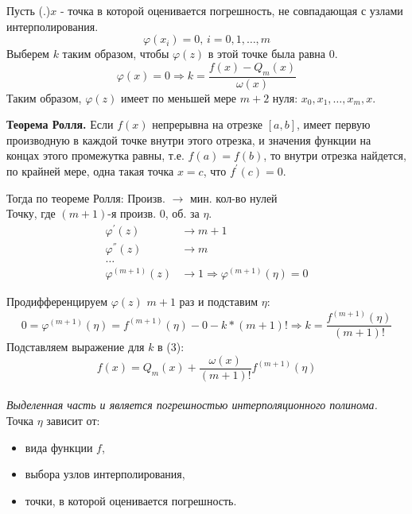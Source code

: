 \documentclass[a4paper,11pt]{article}
\begin{document}
Пусть (.)$x$ - точка в которой оценивается погрешность, не совпадающая с узлами интерполирования.
\[\varphi(x_i) = 0, \, i = 0, 1, \dots, m\]
Выберем $k$ таким образом, чтобы $\varphi(z)$ в этой точке была равна $0$.
\begin{equation}
  \varphi(x) = 0 \Rightarrow k = \frac{f(x) - Q_m(x)}{\omega(x)}
\end{equation}
Таким образом, $\varphi(z)$ имеет по меньшей мере $m+2$ нуля: $x_0, x_1, \dots, x_m, x$. \\
\begin{importantblock}
  \textbf{Теорема Ролля.}
  Если $f(x)$ непрерывна на отрезке $[a,b]$, имеет первую производную в каждой точке внутри этого отрезка, и значения функции на концах этого промежутка равны, т.е. $f(a)=f(b)$, то внутри отрезка найдется, по крайней мере, одна такая точка $x=c$, что $f^{'}(c)=0$.
\end{importantblock}
Тогда по теореме Ролля:
\marginpar
{
  \footnotesize Произв. $\rightarrow$ мин. кол-во нулей \\

  \footnotesize Точку, где $(m+1)$-я произв. 0, об. за $\eta$.
}
\begin{align*}
  \varphi^{'}(z) & \rightarrow m + 1 \\
  \varphi^{''}(z) & \rightarrow m \\
  \dots \\
  \varphi^{(m + 1)}(z) & \rightarrow 1 \Rightarrow \varphi^{(m + 1)}(\eta) = 0
\end{align*}

Продифференцируем $\varphi(z)$ $m+1$ раз и подставим $\eta$:
\[0 = \varphi^{(m+1)}(\eta) = f^{(m+1)}(\eta) - 0 - k * (m + 1)! \Rightarrow k = \frac{f^{(m+1)}(\eta)}{(m+1)!}\]
Подставляем выражение для $k$ в (3):
\[f(x) = Q_m(x) + \boxed{\frac{\omega(x)}{(m+1)!}f^{(m+1)}(\eta)}\] \\
\textit{Выделенная часть и является погрешностью интерполяционного полинома.}
Точка $\eta$ зависит от:
\begin{itemize}
  \item вида функции $f$,
  \item выбора узлов интерполирования,
  \item точки, в которой оценивается погрешность.
\end{itemize}
\end{document}
